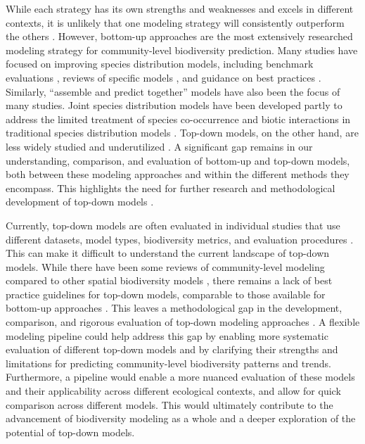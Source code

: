 While each strategy has its own strengths and weaknesses and excels in different contexts, it is unlikely that one modeling strategy will consistently outperform the others \parencite{ferrier2006, zhang2019}. However, bottom-up approaches are the most extensively researched modeling strategy for community-level biodiversity prediction. Many studies have focused on improving species distribution models, including benchmark evaluations \parencite{norberg2019, valavi2022}, reviews of specific models \parencite{waldock2022}, and guidance on best practices \parencite{araujo2019}. Similarly, ``assemble and predict together'' models have also been the focus of many studies. Joint species distribution models have been developed partly to address the limited treatment of species co-occurrence and biotic interactions in traditional species distribution models \parencite{wilkinson2019, escamilla2022}. Top-down models, on the other hand, are less widely studied and underutilized \parencite{pollock2020}. A significant gap remains in our understanding, comparison, and evaluation of bottom-up and top-down models, both between these modeling approaches and within the different methods they encompass. This highlights the need for further research and methodological development of top-down models \parencite{ferrier2006, pollock2020}.

Currently, top-down models are often evaluated in individual studies that use different datasets, model types, biodiversity metrics, and evaluation procedures \parencite{mondal2021, cai2023, ngor2023, baggstrom2025}. This can make it difficult to understand the current landscape of top-down models. While there have been some reviews of community-level modeling compared to other spatial biodiversity models \parencite{nieto2018}, there remains a lack of best practice guidelines for top-down models, comparable to those available for bottom-up approaches \parencite{araujo2019}. This leaves a methodological gap in the development, comparison, and rigorous evaluation of top-down modeling approaches \parencite{pollock2020}. A flexible modeling pipeline could help address this gap by enabling more systematic evaluation of different top-down models and by clarifying their strengths and limitations for predicting community-level biodiversity patterns and trends. Furthermore, a pipeline would enable a more nuanced evaluation of these models and their applicability across different ecological contexts, and allow for quick comparison across different models. This would ultimately contribute to the advancement of biodiversity modeling as a whole and a deeper exploration of the potential of top-down models.


